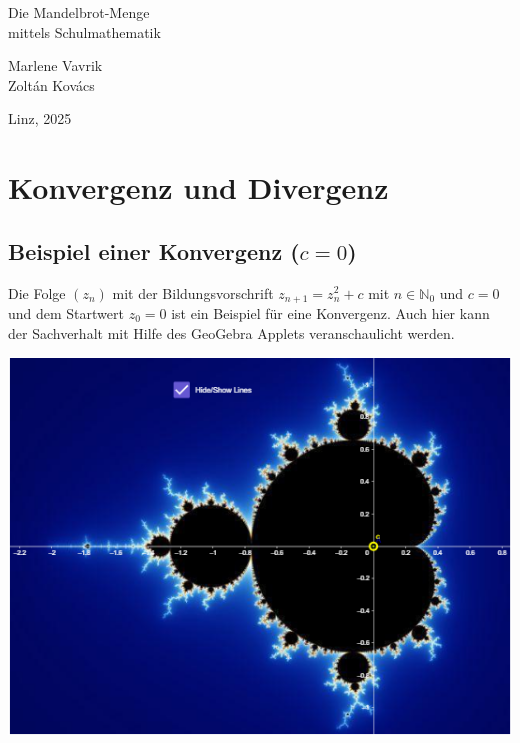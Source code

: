 \documentclass[a4paper, 12pt]{book}
\begin{document}
\sloppy
\frenchspacing

\pagestyle{empty}

\vspace*{1cm}
\begin{center}
{\fontsize{45}{45}\selectfont
Die Mandelbrot-Menge\\
mittels Schulmathematik}
\vskip5cm

{\fontsize{20}{20}\selectfont
Marlene Vavrik\\
\vskip1cm
Zoltán Kovács}
\vskip4cm

{\fontsize{15}{15}\selectfont
Linz, 2025}
\end{center}
\eject

\chapter{Konvergenz und Divergenz}

\pagestyle{plain}

\section{Beispiel einer Konvergenz ($c=0$)}

Die Folge \(\left( z_{n} \right)\) mit der Bildungsvorschrift
\(z_{n + 1} = z_{n}^{2} + c\) mit \(n \in \mathbb{N}_{0}\) und
\(c=0\) und dem Startwert \(z_{0} = 0\) ist ein Beispiel für
eine Konvergenz. Auch hier kann der Sachverhalt mit Hilfe des GeoGebra
Applets veranschaulicht werden.

\begin{center}
\includegraphics[width=0.5\linewidth]{image9.png}
\end{center}

\end{document}
